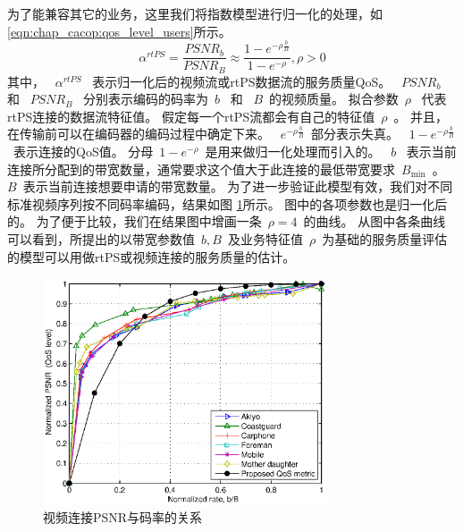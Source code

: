 \begin{enumerate}[(1)]
为了能兼容其它的业务，这里我们将指数模型进行归一化的处理，如
\eqref{eqn:chap_cacop:qos_level_users}所示。
\begin{equation}
\alpha^{rtPS} = \frac{PSNR_b}{PSNR_B} \approx \frac{1- e^{-\rho \frac{b}{B} }}{1-e^{-\rho}}, \rho > 0
\label{eqn:chap_cacop:qos_level_users}
\end{equation}
其中，
~$\alpha^{rtPS}$~ 表示归一化后的视频流或rtPS数据流的服务质量QoS。
~$PSNR_b$~ 和 ~$PSNR_B$~ 分别表示编码的码率为~$b$~ 和 ~$B$~的视频质量。
拟合参数~$\rho$~ 代表 rtPS连接的数据流特征值。
假定每一个rtPS流都会有自己的特征值~$\rho$~。
并且，在传输前可以在编码器的编码过程中确定下来。
~$e^{-\rho \frac{b}{B}}$~部分表示失真。
~$1- e^{-\rho \frac{b}{B}}$~表示连接的QoS值。
分母~$1-e^{-\rho}$~是用来做归一化处理而引入的。
~$b$~ 表示当前连接所分配到的带宽数量，通常要求这个值大于此连接的最低带宽要求~$B_{\min}$~。
~$B$~表示当前连接想要申请的带宽数量。
为了进一步验证此模型有效，我们对不同标准视频序列按不同码率编码，结果如图 \ref{fig:chap_cacop:qos_rate_cac}所示。
图中的各项参数也是归一化后的。
为了便于比较，我们在结果图中增画一条~$\rho=4$~的曲线。
从图中各条曲线可以看到，所提出的以带宽参数值~$b,B$~及业务特征值~$\rho$~为基础的服务质量评估的模型可以用做rtPS或视频连接的服务质量的估计。
\begin{figure}[tb]
\begin{center}
\includegraphics[width=0.75\textwidth] {cacop_qos_rate_cac.eps}
\end{center}
\caption{视频连接PSNR与码率的关系} 
\label{fig:chap_cacop:qos_rate_cac}
\end{figure}


\end{enumerate}
